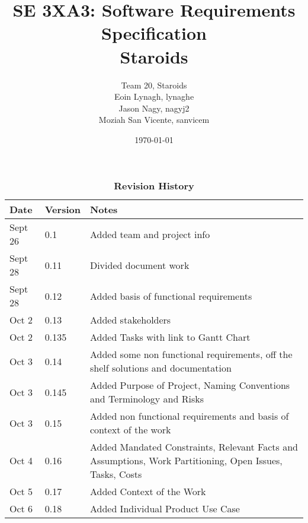 \documentclass[12pt, titlepage]{article}
\title{SE 3XA3: Software Requirements Specification\\Staroids}
\author{Team 20, Staroids
		\\ Eoin Lynagh, lynaghe
		\\ Jason Nagy, nagyj2
		\\ Moziah San Vicente, sanvicem
}
\date{\today}
\begin{document}
\maketitle

\tableofcontents
\listoftables

\begin{table}[bp]
\caption{\bf Revision History}
\begin{tabularx}{\textwidth}{p{3cm}p{2cm}X}
\toprule {\bf Date} & {\bf Version} & {\bf Notes}\\
\midrule
Sept 26 & 0.1 & Added team and project info\\
Sept 28 & 0.11 & Divided document work\\
Sept 28 & 0.12 & Added basis of functional requirements\\
Oct 2 & 0.13 & Added stakeholders\\
Oct 2 & 0.135 & Added Tasks with link to Gantt Chart\\
Oct 3 & 0.14 & Added some non functional requirements, off the shelf solutions and documentation\\
Oct 3 & 0.145 & Added Purpose of Project, Naming Conventions and Terminology and Risks\\
Oct 3 & 0.15 & Added non functional requirements and basis of context of the work\\
Oct 4 & 0.16 & Added Mandated Constraints, Relevant Facts and Assumptions, Work Partitioning, Open Issues, Tasks, Costs\\
Oct 5 & 0.17 & Added Context of the Work\\
Oct 6 & 0.18 & Added Individual Product Use Case\\
\bottomrule
\end{tabularx}
\end{table}

\newpage




\end{document}
